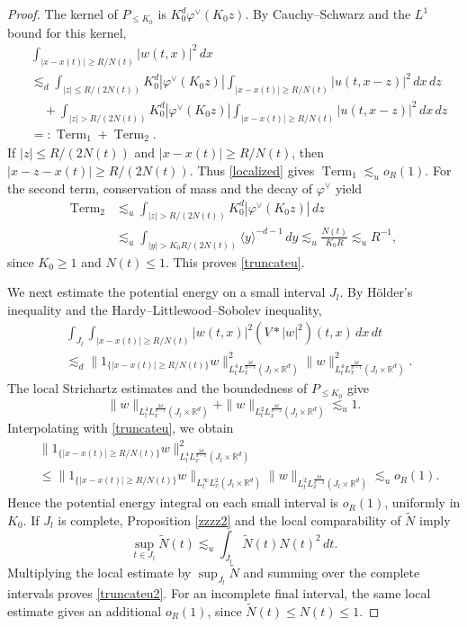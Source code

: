 \documentclass[reqno,11pt]{amsart}
\theoremstyle{plain}
\theoremstyle{definition}
\numberwithin{equation}{section}
\numberwithin{theorem}{section}
\def\geq{\geqslant}
\def\leq{\leqslant}
\def\R{\mathbb{R}}
\begin{document}
\begin{proof}
The kernel of $P_{\leq K_0}$ is $K_0^d\varphi^\vee(K_0z)$. By
Cauchy--Schwarz and the $L^1$ bound for this kernel,
\begin{align*}
 &\int_{|x-x(t)|\geq R/N(t)}|w(t,x)|^2\,dx\\
 &\lesssim_d
 \int_{|z|\leq R/(2N(t))}K_0^d|\varphi^\vee(K_0z)|
       \int_{|x-x(t)|\geq R/N(t)}|u(t,x-z)|^2\,dx\,dz\\
 &\quad+
 \int_{|z|>R/(2N(t))}K_0^d|\varphi^\vee(K_0z)|
       \int_{|x-x(t)|\geq R/N(t)}|u(t,x-z)|^2\,dx\,dz\\
 &=:\operatorname{Term}_1+\operatorname{Term}_2.
\end{align*}
If $|z|\leq R/(2N(t))$ and $|x-x(t)|\geq R/N(t)$, then
$|x-z-x(t)|\geq R/(2N(t))$. Thus \eqref{localized} gives
$\operatorname{Term}_1\lesssim_u o_R(1)$. For the second term, conservation
of mass and the decay of $\varphi^\vee$ yield
\begin{align*}
 \operatorname{Term}_2
 &\lesssim_u\int_{|z|>R/(2N(t))}K_0^d|\varphi^\vee(K_0z)|\,dz\\
 &\lesssim_u\int_{|y|>K_0R/(2N(t))}\langle y\rangle^{-d-1}\,dy
 \lesssim_u\frac{N(t)}{K_0R}\lesssim_u R^{-1},
\end{align*}
since $K_0\geq1$ and $N(t)\leq1$. This proves \eqref{truncateu}.

We next estimate the potential energy on a small interval $J_l$.
By H\"older's inequality and the Hardy--Littlewood--Sobolev inequality,
\begin{align*}
 &\int_{J_l}\int_{|x-x(t)|\geq R/N(t)}
       |w(t,x)|^2(V*|w|^2)(t,x)\,dx\,dt\\
 &\lesssim_d
 \|1_{\{|x-x(t)|\geq R/N(t)\}}w\|_
                   {L_t^4L_x^{\frac{2d}{d-1}}(J_l\times\R^d)}^2
 \|w\|_{L_t^4L_x^{\frac{2d}{d-1}}(J_l\times\R^d)}^2.
\end{align*}
The local Strichartz estimates and the boundedness of $P_{\leq K_0}$ give
\[
 \|w\|_{L_t^4L_x^{\frac{2d}{d-1}}(J_l\times\R^d)}
 +\|w\|_{L_t^2L_x^{\frac{2d}{d-2}}(J_l\times\R^d)}\lesssim_u1.
\]
Interpolating with \eqref{truncateu}, we obtain
\begin{align*}
 &\|1_{\{|x-x(t)|\geq R/N(t)\}}w\|_
                   {L_t^4L_x^{\frac{2d}{d-1}}(J_l\times\R^d)}^2\\
 &\leq
 \|1_{\{|x-x(t)|\geq R/N(t)\}}w\|_{L_t^\infty L_x^2(J_l\times\R^d)}
 \|w\|_{L_t^2L_x^{\frac{2d}{d-2}}(J_l\times\R^d)}
 \lesssim_u o_R(1).
\end{align*}
Hence the potential energy integral on each small interval is $o_R(1)$,
uniformly in $K_0$. If $J_l$ is complete, Proposition \ref{zzzz2} and the
local comparability of $\tilde N$ imply
\[
 \sup_{t\in J_l}\tilde N(t)
 \lesssim_u\int_{J_l}\tilde N(t)N(t)^2\,dt.
\]
Multiplying the local estimate by $\sup_{J_l}\tilde N$ and summing over
the complete intervals proves \eqref{truncateu2}. For an incomplete final
interval, the same local estimate gives an additional $o_R(1)$, since
$\tilde N(t)\leq N(t)\leq1$.
\end{proof}
\end{document}
